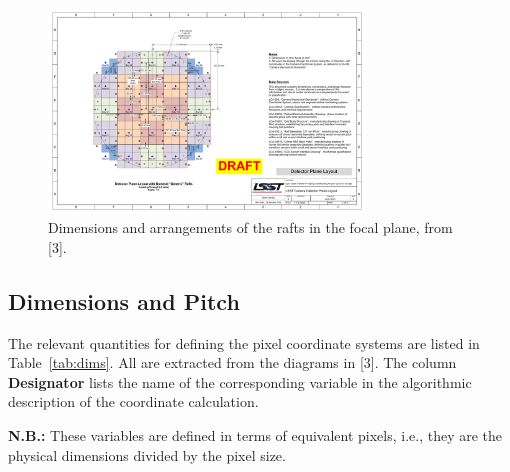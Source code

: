 \documentclass{article}[12pt]
\begin{document}
\begin{figure}
\centering
    \includegraphics[width=0.75\textwidth]{focal_plane_layout.pdf}
    \caption{Dimensions and arrangements of the rafts in the focal plane, from [3].}
    \label{fig:focalplane}
\end{figure}

\subsection{Dimensions and Pitch}
The relevant quantities for defining the pixel coordinate systems are listed in Table~\ref{tab:dims}.  All are extracted from the diagrams in [3].  The column {\bf Designator} lists the name of the corresponding variable in the algorithmic description of the coordinate calculation.  

{\bf N.B.:} These variables are defined in terms of equivalent pixels, i.e., they are the physical dimensions divided by the pixel size.
\end{document}
